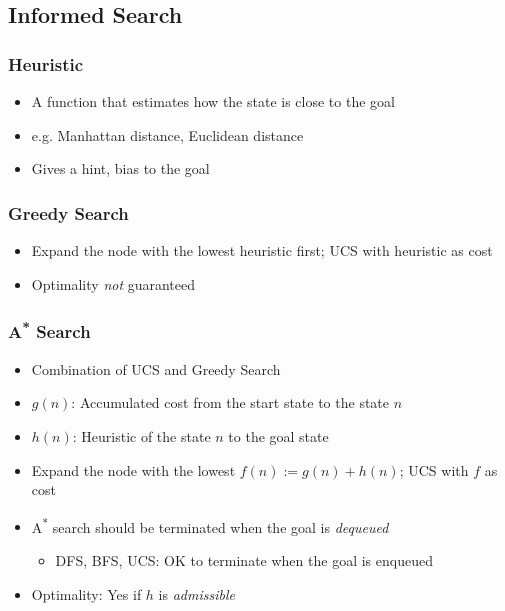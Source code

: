 \subsection{Informed Search}

\subsubsection*{Heuristic}
\begin{itemize}
    \item A function that estimates how the state is close to the goal
    \item e.g. Manhattan distance, Euclidean distance
    \item Gives a hint, bias to the goal
\end{itemize}

\subsubsection*{Greedy Search}
\begin{itemize}
    \item Expand the node with the lowest heuristic first; UCS with heuristic as cost
    \item Optimality \textit{not} guaranteed
\end{itemize}

\subsubsection*{A\textsuperscript{*} Search}
\begin{itemize}
    \item Combination of UCS and Greedy Search
    \item $g(n)$: Accumulated cost from the start state to the state $n$
    \item $h(n)$: Heuristic of the state $n$ to the goal state
    \item Expand the node with the lowest $f(n):=g(n)+h(n)$; UCS with $f$ as cost
    \item A\textsuperscript{*} search should be terminated when the goal is \textit{dequeued}
    \begin{itemize}
        \item DFS, BFS, UCS: OK to terminate when the goal is enqueued
    \end{itemize}
    \item Optimality: Yes if $h$ is \textit{admissible}
\end{itemize}

